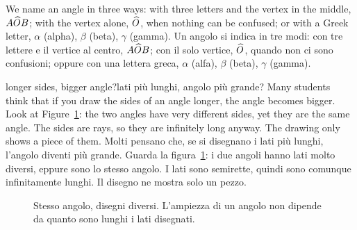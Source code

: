 \begin{bi}
We name an angle in three ways: with three letters and the vertex in the middle, $A\widehat{O}B$; with the vertex alone, $\widehat{O}$, when nothing can be confused; or with a Greek letter, $\alpha$ (alpha), $\beta$ (beta), $\gamma$ (gamma).
\IT
Un angolo si indica in tre modi: con tre lettere e il vertice al centro, $A\widehat{O}B$; con il solo vertice, $\widehat{O}$, quando non ci sono confusioni; oppure con una lettera greca, $\alpha$ (alfa), $\beta$ (beta), $\gamma$ (gamma).
\end{bi}

\begin{trap}{longer sides, bigger angle?}{lati più lunghi, angolo più grande?}
Many students think that if you draw the sides of an angle longer, the angle becomes bigger. Look at Figure~\ref{fig:sides}: the two angles have very different sides, yet they are the same angle. The sides are rays, so they are infinitely long anyway. The drawing only shows a piece of them.
\tcblower
Molti pensano che, se si disegnano i lati più lunghi, l'angolo diventi più grande. Guarda la figura~\ref{fig:sides}: i due angoli hanno lati molto diversi, eppure sono lo stesso angolo. I lati sono semirette, quindi sono comunque infinitamente lunghi. Il disegno ne mostra solo un pezzo.
\end{trap}

\begin{figure}[htbp]
\centering
%
      {Stesso angolo, disegni diversi. L'ampiezza di un angolo non dipende da quanto sono lunghi i lati disegnati.}
\label{fig:sides}
\end{figure}


